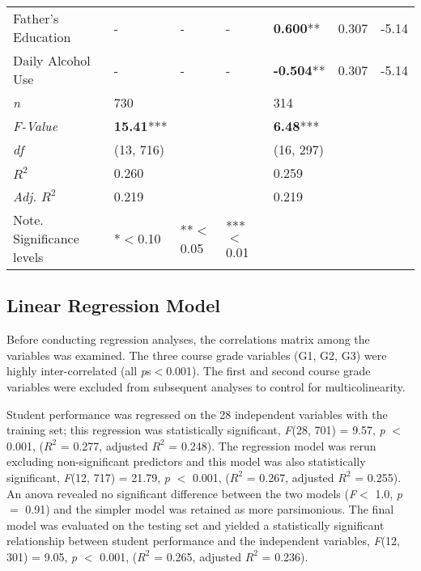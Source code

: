 \documentclass[sigconf]{acmart}
\begin{document}
\begin{table*}[ht]
\begin{tabular}{lllllll}
    Father's Education  &           -        &  -    &  -     & \textbf{ 0.600}**   & 0.307 & -5.14 \\
    Daily Alcohol Use   &           -        &  -    &  -     & \textbf{-0.504}**   & 0.307 & -5.14 \\
    \midrule
    \textit{n}          &       730          &       &        &         314         &       &       \\
    \textit{F-Value}    & \textbf{15.41}***  &       &        & \textbf{6.48}***    &       &       \\
    \textit{df}         &   (13, 716)        &       &        &      (16, 297)      &       &       \\
    \textit{$R^2$}      &      0.260         &       &        &         0.259       &       &       \\ 
    \textit{Adj. $R^2$} &      0.219         &       &        &         0.219       &       &       \\
    \bottomrule
    Note. Significance levels & *$<$0.10      & **$<$0.05  & ***$<$0.01 & & &
  \end{tabular}
\end{table*}



\subsection{Linear Regression Model}

Before conducting regression analyses, the correlations matrix among the 
variables was examined. The three course grade variables (G1, G2, G3) were 
highly inter-correlated (all \textit{p}s$<$0.001). The first and second course 
grade variables were excluded from subsequent analyses to control for
multicolinearity. 

Student performance was regressed on the 28 independent 
variables with the training set; this regression was statistically significant, 
\textit{F}(28, 701) = 9.57, \textit{p} $<$ 0.001, ($R^2$ = 0.277, adjusted 
$R^2$ = 0.248). The regression model was rerun excluding non-significant 
predictors and this model was also statistically significant,
\textit{F}(12, 717) = 21.79, \textit{p} $<$ 0.001, ($R^2$ = 0.267, adjusted 
$R^2$ = 0.255). An anova revealed no significant difference between the two 
models (\textit{F}$<$ 1.0, \textit{p} $=$ 0.91) and the simpler model was 
retained as more parsimonious. The final model was evaluated on the testing 
set and yielded a statistically significant relationship between student 
performance and the independent variables, \textit{F}(12, 301) = 9.05, 
\textit{p} $<$ 0.001, ($R^2$ = 0.265, adjusted $R^2$ = 0.236). 
\end{document}
